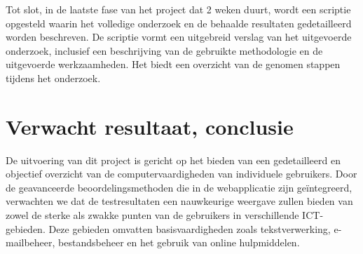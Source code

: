 Tot slot, in de laatste fase van het project dat 2 weken duurt, wordt een scriptie opgesteld waarin het volledige onderzoek en de behaalde resultaten gedetailleerd worden beschreven. De scriptie vormt een uitgebreid verslag van het uitgevoerde onderzoek, inclusief een beschrijving van de gebruikte methodologie en de uitgevoerde werkzaamheden. Het biedt een overzicht van de genomen stappen tijdens het onderzoek.



\section{Verwacht resultaat, conclusie}%
\label{sec:verwachte_resultaten}




De uitvoering van dit project is gericht op het bieden van een gedetailleerd en objectief overzicht van de computervaardigheden van individuele gebruikers. Door de geavanceerde beoordelingsmethoden die in de webapplicatie zijn geïntegreerd, verwachten we dat de testresultaten een nauwkeurige weergave zullen bieden van zowel de sterke als zwakke punten van de gebruikers in verschillende ICT-gebieden. Deze gebieden omvatten basisvaardigheden zoals tekstverwerking, e-mailbeheer, bestandsbeheer en het gebruik van online hulpmiddelen.


